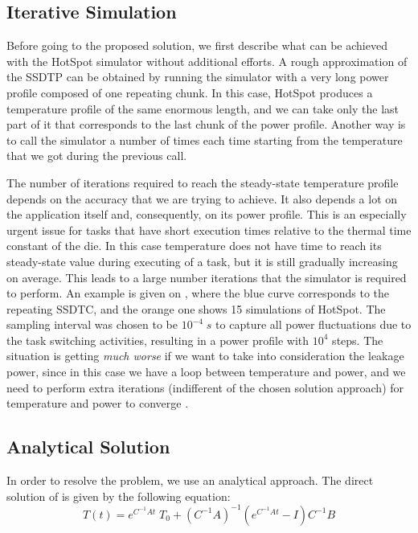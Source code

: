 \subsection{Iterative Simulation}
Before going to the proposed solution, we first describe what can be achieved with the HotSpot simulator without additional efforts. A rough approximation of the SSDTP can be obtained by running the simulator with a very long power profile composed of one repeating chunk. In this case, HotSpot produces a temperature profile of the same enormous length, and we can take only the last part of it that corresponds to the last chunk of the power profile. Another way is to call the simulator a number of times each time starting from the temperature that we got during the previous call.

The number of iterations required to reach the steady-state temperature profile depends on the accuracy that we are trying to achieve. It also depends a lot on the application itself and, consequently, on its power profile. This is an especially urgent issue for tasks that have short execution times relative to the thermal time constant of the die. In this case temperature does not have time to reach its steady-state value during executing of a task, but it is still gradually increasing on average. This leads to a large number iterations that the simulator is required to perform. An example is given on , where the blue curve corresponds to the repeating SSDTC, and the orange one shows 15 simulations of HotSpot. The sampling interval was chosen to be $10^{-4} \; s$ to capture all power fluctuations due to the task switching activities, resulting in a power profile with $10^4$ steps. The situation is getting \emph{much worse} if we want to take into consideration the leakage power, since in this case we have a loop between temperature and power, and we need to perform extra iterations (indifferent of the chosen solution approach) for temperature and power to converge \cite{liu2007}.

\subsection{Analytical Solution}
In order to resolve the problem, we use an analytical approach. The direct solution of  is given by the following equation:
\begin{equation} \label{eq:solution}
  T(t) = e^{C^{-1}A t} \; T_0 + (C^{-1} A)^{-1}(e^{C^{-1}A t} - I)C^{-1} B
\end{equation}

